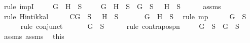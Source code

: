 \begin{isabellebody}
%
\isadelimproof
%
\endisadelimproof
%
\isatagproof
{}\isamarkupfalse%
\ {\isacharparenleft}rule\ impI{\isacharparenright}\isanewline
\ \ \isamarkupfalse%
\ {\isachardoublequoteopen}\isactrlbold {\isasymnot}\ {\isacharparenleft}G\ \isactrlbold {\isasymrightarrow}\ H{\isacharparenright}\ {\isasymin}\ S{\isachardoublequoteclose}\isanewline
\ \ \isamarkupfalse%
\ {\isachardoublequoteopen}\isactrlbold {\isasymnot}\ {\isacharparenleft}G\ \isactrlbold {\isasymrightarrow}\ H{\isacharparenright}\ {\isasymin}\ S\ {\isasymlongrightarrow}\ {\isacharparenleft}G\ {\isasymin}\ S\ {\isasymand}\ \isactrlbold {\isasymnot}\ H\ {\isasymin}\ S{\isacharparenright}{\isachardoublequoteclose}\isanewline
\ \ \ \ \isamarkupfalse%
\ assms{\isacharparenleft}{}{\isacharparenright}\ \isamarkupfalse%
\ {\isacharparenleft}rule\ Hintikka{\isacharunderscore}l{}{\isacharparenright}\isanewline
\ \ \isamarkupfalse%
\ \isamarkupfalse%
\ C{\isacharcolon}{\isachardoublequoteopen}G\ {\isasymin}\ S\ {\isasymand}\ \isactrlbold {\isasymnot}\ H\ {\isasymin}\ S{\isachardoublequoteclose}\isanewline
\ \ \ \ \isamarkupfalse%
\ {\isacartoucheopen}\isactrlbold {\isasymnot}\ {\isacharparenleft}G\ \isactrlbold {\isasymrightarrow}\ H{\isacharparenright}\ {\isasymin}\ S{\isacartoucheclose}\ \isamarkupfalse%
\ {\isacharparenleft}rule\ mp{\isacharparenright}\isanewline
\ \ \isamarkupfalse%
\ \isamarkupfalse%
\ {\isachardoublequoteopen}G\ {\isasymin}\ S{\isachardoublequoteclose}\isanewline
\ \ \ \ \isamarkupfalse%
\ {\isacharparenleft}rule\ conjunct{}{\isacharparenright}\isanewline
\ \ \isamarkupfalse%
\ \isamarkupfalse%
\ {\isachardoublequoteopen}{\isasymnot}\ {\isacharparenleft}G\ {\isasymnotin}\ S{\isacharparenright}{\isachardoublequoteclose}\isanewline
\ \ \ \ \isamarkupfalse%
\ {\isacharparenleft}rule\ contrapos{\isacharunderscore}pn{\isacharparenright}\isanewline
\ \ \isamarkupfalse%
\ {\isachardoublequoteopen}\isactrlbold {\isasymnot}\ G\ {\isasymin}\ S\ {\isasymlongrightarrow}\ G\ {\isasymnotin}\ S{\isachardoublequoteclose}\isanewline
\ \ \ \ \isamarkupfalse%
\ assms{\isacharparenleft}{}{\isacharparenright}\ assms{\isacharparenleft}{}{\isacharparenright}\ \isamarkupfalse%
\ this\isanewline
\ \ \isamarkupfalse%
\ \isamarkupfalse%

\end{isabellebody}
